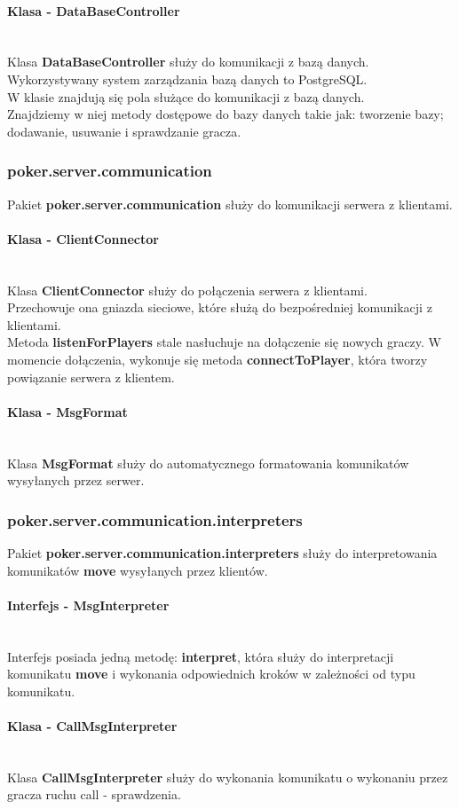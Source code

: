 \documentclass{article}
\newcommand{\mparagraph}[1]{\paragraph{#1}\mbox{}\vspace{2mm}\\}
\begin{document}
            \mparagraph{Klasa - DataBaseController}
                Klasa \textbf{DataBaseController} służy do komunikacji z bazą danych.
                Wykorzystywany system zarządzania bazą danych to PostgreSQL.
                \\
                W klasie znajdują się pola służące do komunikacji z bazą danych.
                \\
                Znajdziemy w niej metody dostępowe do bazy danych takie jak: tworzenie bazy; dodawanie, usuwanie i sprawdzanie gracza.
                
                
        \subsubsection{poker.server.communication}
            Pakiet \textbf{poker.server.communication} służy do komunikacji serwera z klientami.
            
            \mparagraph{Klasa - ClientConnector}
                Klasa \textbf{ClientConnector} służy do połączenia serwera z klientami.
                \\
                Przechowuje ona gniazda sieciowe, które służą do bezpośredniej komunikacji z klientami.
                \\
                Metoda \textbf{listenForPlayers} stale nasłuchuje na dołączenie się nowych graczy.
                W momencie dołączenia, wykonuje się metoda \textbf{connectToPlayer}, która tworzy powiązanie serwera z klientem.
                
            \mparagraph{Klasa - MsgFormat}
                Klasa \textbf{MsgFormat} służy do automatycznego formatowania komunikatów wysyłanych przez serwer.
    
        \subsubsection{poker.server.communication.interpreters}
            Pakiet \textbf{poker.server.communication.interpreters} służy do interpretowania komunikatów \textbf{move} wysyłanych przez klientów.
        
            \mparagraph{Interfejs - MsgInterpreter}
                Interfejs posiada jedną metodę: \textbf{interpret}, która służy do interpretacji komunikatu \textbf{move} i wykonania odpowiednich kroków w zależności od typu komunikatu.
        
            \mparagraph{Klasa - CallMsgInterpreter}
                Klasa \textbf{CallMsgInterpreter} służy do wykonania komunikatu o wykonaniu przez gracza ruchu call - sprawdzenia.
                
\end{document}
